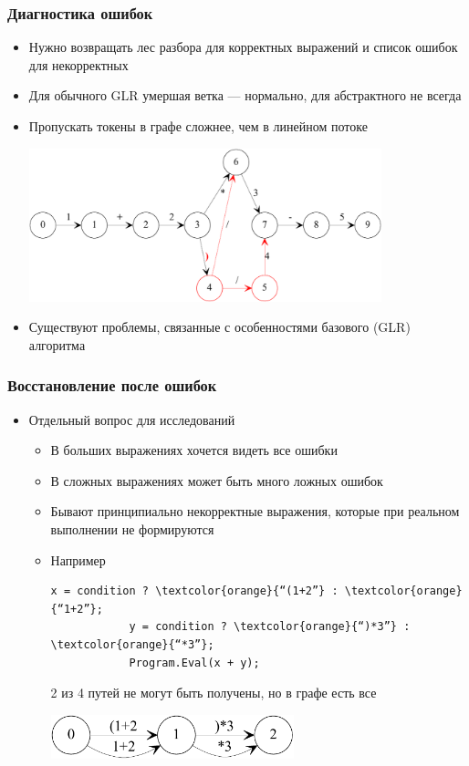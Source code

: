 \documentclass{beamer}
\begin{document}
\begin{frame}[fragile]
	\transwipe[direction=90]
	\frametitle{Диагностика ошибок}
    \begin{itemize}
    	\item Нужно возвращать лес разбора для корректных выражений и список ошибок для некорректных
        \item Для обычного GLR умершая ветка — нормально, для абстрактного не всегда
        \item Пропускать токены в графе сложнее, чем в линейном потоке
	        \begin{center}
	            \includegraphics[width=290pt]{picts/IgnoringPaths.pdf}
	        \end{center}
        \item Существуют проблемы, связанные с особенностями базового (GLR) алгоритма
	\end{itemize}
\end{frame}

\begin{frame}[fragile]
	\transwipe[direction=90]
	\frametitle{Восстановление после ошибок}
    \begin{itemize}
        \item Отдельный вопрос для исследований
        \begin{itemize}
            \item В больших выражениях хочется видеть все ошибки
            \item В сложных выражениях может быть много ложных ошибок
            \item Бывают принципиально некорректные выражения, которые при реальном выполнении не формируются
            \item Например
            
            \begin{Verbatim}[commandchars=\\\{\}]
            x = condition ? \textcolor{orange}{“(1+2”} : \textcolor{orange}{“1+2”};
            y = condition ? \textcolor{orange}{“)*3”} : \textcolor{orange}{“*3”};
            Program.Eval(x + y);
            \end{Verbatim}
            2 из 4 путей не могут быть получены, но в графе есть все
	        \begin{center}
	            \includegraphics[width=200pt]{picts/4insteadOf2.pdf}
	        \end{center}
        \end{itemize}
	\end{itemize}
\end{frame}
\end{document}

